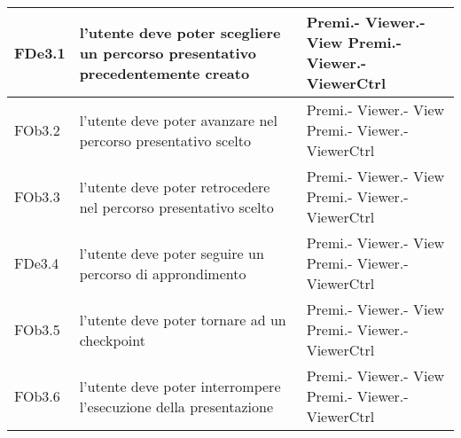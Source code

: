 \begin{longtable}{|l|p{5cm}|p{7cm}|}
\hline
FDe3.1 & l'utente deve poter scegliere un percorso presentativo precedentemente creato & Premi.- \linebreak Viewer.- \linebreak View \linebreak Premi.- \linebreak Viewer.- \linebreak ViewerCtrl \linebreak \\
\hline
FOb3.2 & l'utente deve poter avanzare nel percorso presentativo scelto & Premi.- \linebreak Viewer.- \linebreak View \linebreak Premi.- \linebreak Viewer.- \linebreak ViewerCtrl \linebreak \\
\hline
FOb3.3 & l'utente deve poter retrocedere nel percorso presentativo scelto & Premi.- \linebreak Viewer.- \linebreak View \linebreak Premi.- \linebreak Viewer.- \linebreak ViewerCtrl \linebreak \\
\hline
FDe3.4 & l'utente deve poter seguire un percorso di approndimento & Premi.- \linebreak Viewer.- \linebreak View \linebreak Premi.- \linebreak Viewer.- \linebreak ViewerCtrl \linebreak \\
\hline
FOb3.5 & l'utente deve poter tornare ad un checkpoint & Premi.- \linebreak Viewer.- \linebreak View \linebreak Premi.- \linebreak Viewer.- \linebreak ViewerCtrl \linebreak \\
\hline
FOb3.6 & l'utente deve poter interrompere l'esecuzione della presentazione & Premi.- \linebreak Viewer.- \linebreak View \linebreak Premi.- \linebreak Viewer.- \linebreak ViewerCtrl \linebreak \\

\end{longtable}
